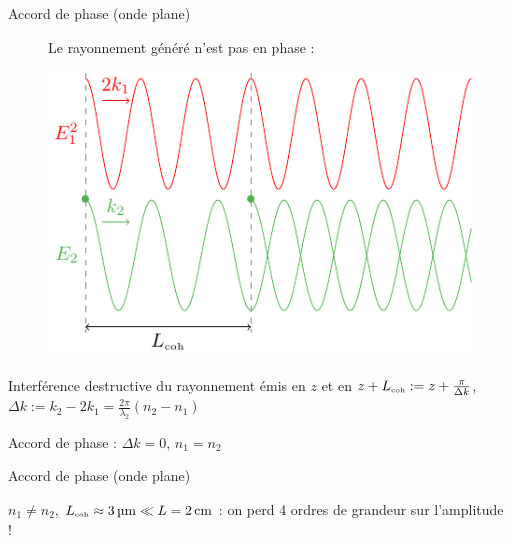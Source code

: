 \documentclass{beamer}
\begin{document}
\begin{frame}{Accord de phase (onde plane)}

\begin{figure}
\centering
\begin{beamerboxesrounded}[width=\textwidth]{}
Le rayonnement généré n'est pas en phase :
\end{beamerboxesrounded}
\includegraphics[scale=0.9]{img/accord.pdf}
\end{figure}
\vspace{-0.5cm}
Interférence destructive du rayonnement émis en $z$ et en  $z+L_{\mathrm{\scriptscriptstyle {coh}}} := z + \frac{\pi}{\Delta k}$, $\Delta k := k_2 - 2 k_1 = \frac{2\pi}{\lambda_2} \left(n_2 - n_1\right)$

Accord de phase : $\Delta k = 0$, $n_1 = n_2$
\end{frame}

\begin{frame}{Accord de phase (onde plane)}
\centering

\begin{beamerboxesrounded}[width=0.8\textwidth]{}
$n_1\neq n_2$, $L_{\mathrm{\scriptscriptstyle {coh}}} \approx \SI{3}{\micro\meter} \ll L = \SI{2}{cm}$ : on perd 4 ordres de grandeur sur l'amplitude !
\end{beamerboxesrounded}
\end{frame}
\end{document}
